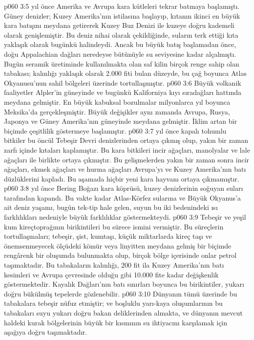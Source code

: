 \vs p060 3:5  yıl önce Amerika ve Avrupa kara kütleleri tekrar batmaya başlamıştı. Güney denizler; Kuzey Amerika’nın istilasına başlayıp, kıtanın ikinci en büyük kara batışını meydana getirerek Kuzey Buz Denizi ile kuzeye doğru kademeli olarak genişlemiştir. Bu deniz nihai olarak çekildiğinde, suların terk ettiği kıta yaklaşık olarak bugünkü halindeydi. Ancak bu büyük batış başlamadan önce, doğu Appalachian dağları neredeyse bütünüyle su seviyesine kadar alçalmıştı. Bugün seramik üretiminde kullanılmakta olan saf kilin birçok renge sahip olan tabakası; kalınlığı yaklaşık olarak 2.000 fiti bulan düzeyde, bu çağ boyunca Atlas Okyanusu’nun sahil bölgeleri üzerinde tortullaşmıştır.
\vs p060 3:6 Büyük volkanik faaliyetler Alpler’in güneyinde ve bugünkü Kaliforniya kıyı sıradağları hattında meydana gelmiştir. En büyük kabuksal bozulmalar milyonlarca yıl boyunca Meksika’da gerçekleşmiştir. Büyük değişikler aynı zamanda Avrupa, Rusya, Japonya ve Güney Amerika’nın güneyinde meydana gelmiştir. İklim artan bir biçimde çeşitlilik göstermeye başlamıştır.
\vs p060 3:7  yıl önce kapalı tohumlu bitkiler bu öncül Tebeşir Devri denizlerinden ortaya çıkmış olup, yakın bir zaman zarfı içinde kıtaları kaplamıştır. Bu kara bitkileri  incir ağaçları, manolyalar ve lale ağaçları ile birlikte ortaya çıkmıştır. Bu gelişmelerden yakın bir zaman sonra incir ağaçları, ekmek ağaçları ve hurma ağaçları Avrupa’yı ve Kuzey Amerika’nın batı düzlüklerini kapladı. Bu aşamada hiçbir yeni kara hayvanı ortaya çıkmamıştır.
\vs p060 3:8  yıl önce Bering Boğazı kara köprüsü, kuzey denizlerinin soğuyan suları tarafından kapandı. Bu vakte kadar Atlas\hyp{}Körfez sularına ve Büyük Okyanus’a ait deniz yaşamı, bugün tek\hyp{}tip hale gelen, suyun bu iki bedenindeki ısı farklılıkları nedeniyle büyük farklılıklar göstermekteydi.
\vs p060 3:9 Tebeşir ve yeşil kum kireçtoprağının birikintileri bu sürece ismini vermiştir. Bu süreçlerin tortullaşmaları; tebeşir, şist, kumtaşı, küçük miktarlarda kireç taşı ve önemsenmeyecek ölçüdeki kömür veya linyitten meydana gelmiş bir biçimde rengârenk bir oluşumda bulunmakta olup, birçok bölge içerisinde onlar petrol taşımaktadır. Bu tabakaların kalınlığı, 200 fit ila Kuzey Amerika’nın batı kesimleri ve Avrupa çevresinde olduğu gibi 10.000 fite kadar değişkenlik göstermektedir. Kayalık Dağları’nın batı sınırları boyunca bu birikintiler, yukarı doğru bükülmüş tepelerde gözlenebilir.
\vs p060 3:10 Dünyanın tümü üzerinde bu tabakalara tebeşir nüfuz etmiştir; ve boşluklu yarı\hyp{}kaya oluşumlarının bu tabakaları suyu yukarı doğru bakan deliklerinden almakta, ve dünyanın mevcut haldeki kurak bölgelerinin büyük bir kısmının su ihtiyacını karşılamak için aşağıya doğru taşımaktadır.
